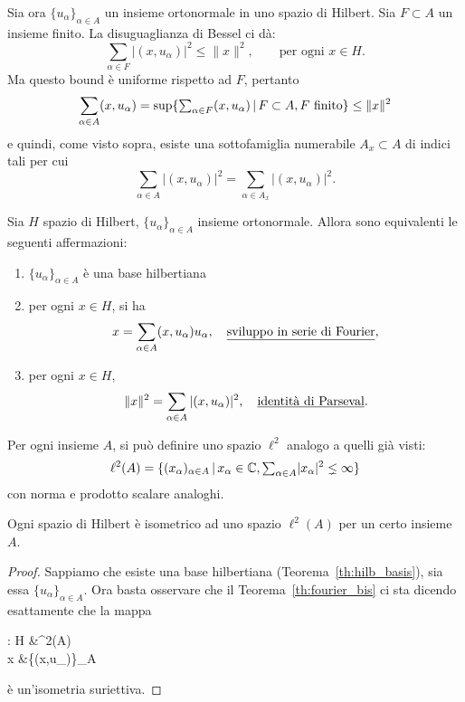 Sia ora $\{u_\alpha\}_{\alpha \in A}$ un insieme ortonormale in uno spazio di Hilbert. Sia $F \subset A$ un insieme finito. La disuguaglianza di Bessel ci dà:
\begin{equation*}
	\sum_{\alpha \in F}|(x,u_\alpha)|^2 \leq \|x\|^2, \qquad \text{per ogni $x \in H$}.
\end{equation*}
Ma questo bound è uniforme rispetto ad $F$, pertanto
\begin{equation*}
	\sum_{\alpha \in A} (x, u_\alpha) = \sup \{ {\textstyle \sum_{\alpha \in F}} (x,u_\alpha) \,|\, F \subset A, \text{$F$ finito} \} \leq \|x\|^2
\end{equation*}
e quindi, come visto sopra, esiste una sottofamiglia numerabile $A_x \subset A$ di indici tali per cui
\begin{equation*}
	\sum_{\alpha \in A} |(x,u_\alpha)|^2 = \sum_{\alpha \in A_x} |(x,u_\alpha)|^2.
\end{equation*}

\begin{theorem}
\label{th:fourier_bis}
	Sia $H$ spazio di Hilbert, $\{u_\alpha\}_{\alpha \in A}$ insieme ortonormale.
	Allora sono equivalenti le seguenti affermazioni:
	\begin{enumerate}
		\item $\{u_\alpha\}_{\alpha \in A}$ è una base hilbertiana
		\item per ogni $x \in H$, si ha
		\begin{equation*}
			x= \sum_{\alpha \in A} (x,u_\alpha)u_\alpha, \quad \text{\underline{sviluppo in serie di Fourier}},
		\end{equation*}
		\item per ogni $x \in H$,
		\begin{equation*}
			\|x\|^2 = \sum_{\alpha \in A} |(x,u_\alpha)|^2, \quad \text{\underline{identità di Parseval}}.
		\end{equation*}
	\end{enumerate}
\end{theorem}

Per ogni insieme $A$, si può definire uno spazio $\ell^2$ analogo a quelli già visti:
\begin{equation*}
	\ell^2(A) = \{(x_\alpha)_{\alpha \in A} \,|\, x_\alpha \in \mathbb{C}, {\textstyle \sum_{\alpha \in A}} |x_\alpha|^2 \lneq \infty \}
\end{equation*}
con norma e prodotto scalare analoghi.

\begin{theorem}
	Ogni spazio di Hilbert è isometrico ad uno spazio $\ell^2(A)$ per un certo insieme $A$.
\end{theorem}
\begin{proof}
	Sappiamo che esiste una base hilbertiana (Teorema~\ref{th:hilb_basis}), sia essa $\{u_\alpha\}_{\alpha \in A}$. Ora basta osservare che il Teorema~\ref{th:fourier_bis} ci sta dicendo esattamente che la mappa
	\begin{eqalign*}
		\varphi : H &\longto \ell^2(A)\\
				x &\longmapsto \{(x,u_\alpha)\}_{\alpha \in A}
	\end{eqalign*}
	è un'isometria suriettiva.
\end{proof}

